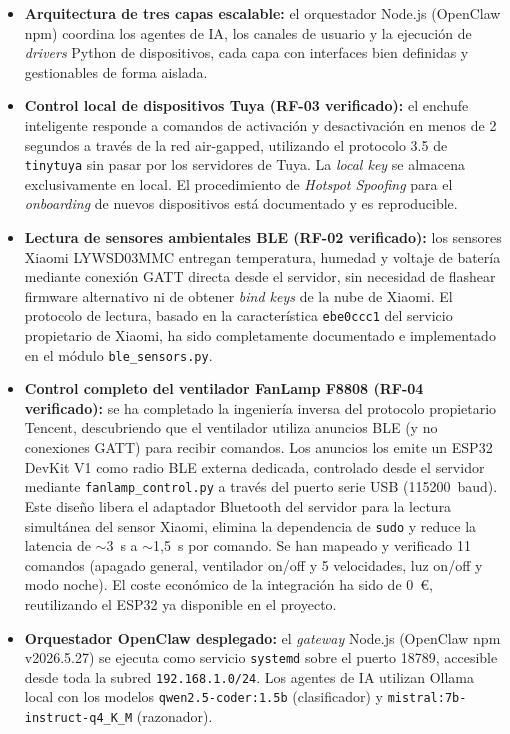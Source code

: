 \begin{itemize}
    \item \textbf{Arquitectura de tres capas escalable:} el orquestador Node.js (OpenClaw npm) coordina los agentes de IA, los canales de usuario y la ejecución de \textit{drivers} Python de dispositivos, cada capa con interfaces bien definidas y gestionables de forma aislada.

    \item \textbf{Control local de dispositivos Tuya (RF-03 verificado):} el enchufe inteligente responde a comandos de activación y desactivación en menos de 2 segundos a través de la red air-gapped, utilizando el protocolo 3.5 de \texttt{tinytuya} sin pasar por los servidores de Tuya. La \textit{local key} se almacena exclusivamente en local. El procedimiento de \textit{Hotspot Spoofing} para el \textit{onboarding} de nuevos dispositivos está documentado y es reproducible.

    \item \textbf{Lectura de sensores ambientales BLE (RF-02 verificado):} los sensores Xiaomi LYWSD03MMC entregan temperatura, humedad y voltaje de batería mediante conexión GATT directa desde el servidor, sin necesidad de flashear firmware alternativo ni de obtener \textit{bind keys} de la nube de Xiaomi. El protocolo de lectura, basado en la característica \texttt{ebe0ccc1} del servicio propietario de Xiaomi, ha sido completamente documentado e implementado en el módulo \texttt{ble\_sensors.py}.

    \item \textbf{Control completo del ventilador FanLamp F8808 (RF-04 verificado):} se ha completado la ingeniería inversa del protocolo propietario Tencent, descubriendo que el ventilador utiliza anuncios BLE (y no conexiones GATT) para recibir comandos. Los anuncios los emite un ESP32 DevKit V1 como radio BLE externa dedicada, controlado desde el servidor mediante \texttt{fanlamp\_control.py} a través del puerto serie USB (115200~baud). Este diseño libera el adaptador Bluetooth del servidor para la lectura simultánea del sensor Xiaomi, elimina la dependencia de \texttt{sudo} y reduce la latencia de $\sim$3~s a $\sim$1,5~s por comando. Se han mapeado y verificado 11 comandos (apagado general, ventilador on/off y 5 velocidades, luz on/off y modo noche). El coste económico de la integración ha sido de 0~\euro{}, reutilizando el ESP32 ya disponible en el proyecto.

    \item \textbf{Orquestador OpenClaw desplegado:} el \textit{gateway} Node.js (OpenClaw npm v2026.5.27) se ejecuta como servicio \texttt{systemd} sobre el puerto 18789, accesible desde toda la subred \texttt{192.168.1.0/24}. Los agentes de IA utilizan Ollama local con los modelos \texttt{qwen2.5-coder:1.5b} (clasificador) y \texttt{mistral:7b-instruct-q4\_K\_M} (razonador).


\end{itemize}
